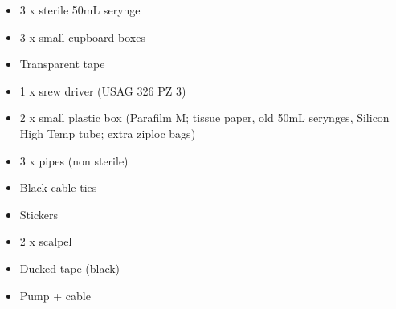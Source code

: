 \begin{itemize}
\item 3 x sterile 50mL serynge
\item 3 x small cupboard boxes
\item Transparent tape
\item 1 x srew driver (USAG 326 PZ 3)
\item 2 x small plastic box (Parafilm M; tissue paper, old 50mL serynges, Silicon High Temp tube; extra ziploc bags)
\item 3 x pipes (non sterile)
\item Black cable ties
\item Stickers
\item 2 x scalpel
\item Ducked tape (black)
\item Pump + cable
\end{itemize}